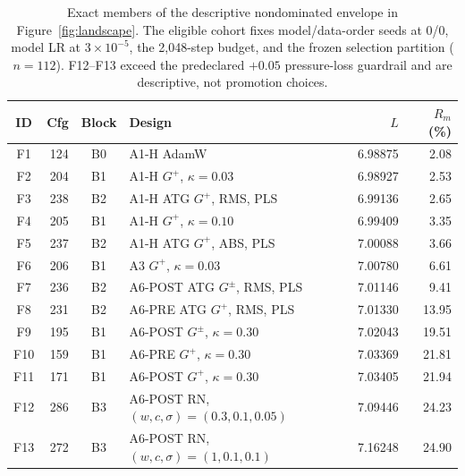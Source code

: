 \begin{table}[H]
\centering
\footnotesize
\setlength{\tabcolsep}{4.5pt}
\caption{Exact members of the descriptive nondominated envelope in Figure~\ref{fig:landscape}. The eligible cohort fixes model/data-order seeds at 0/0, model LR at $3\times10^{-5}$, the 2,048-step budget, and the frozen selection partition ($n=112$). F12--F13 exceed the predeclared $+0.05$ pressure-loss guardrail and are descriptive, not promotion choices.}
\label{tab:frontier}
\begin{tabularx}{\textwidth}{c r c X r r}
\toprule
ID & Cfg & Block & Design & $L$ & $R_m$ (\%) \\
\midrule
F1 & 124 & B0 & A1-H AdamW & 6.98875 & 2.08 \\
F2 & 204 & B1 & A1-H $G^+$, $\kappa=0.03$ & 6.98927 & 2.53 \\
F3 & 238 & B2 & A1-H ATG $G^+$, RMS, PLS & 6.99136 & 2.65 \\
F4 & 205 & B1 & A1-H $G^+$, $\kappa=0.10$ & 6.99409 & 3.35 \\
F5 & 237 & B2 & A1-H ATG $G^+$, ABS, PLS & 7.00088 & 3.66 \\
F6 & 206 & B1 & A3 $G^+$, $\kappa=0.03$ & 7.00780 & 6.61 \\
F7 & 236 & B2 & A6-POST ATG $G^\pm$, RMS, PLS & 7.01146 & 9.41 \\
F8 & 231 & B2 & A6-PRE ATG $G^+$, RMS, PLS & 7.01330 & 13.95 \\
F9 & 195 & B1 & A6-POST $G^\pm$, $\kappa=0.30$ & 7.02043 & 19.51 \\
F10 & 159 & B1 & A6-PRE $G^+$, $\kappa=0.30$ & 7.03369 & 21.81 \\
F11 & 171 & B1 & A6-POST $G^+$, $\kappa=0.30$ & 7.03405 & 21.94 \\
F12 & 286 & B3 & A6-POST RN, $(w,c,\sigma)=(0.3,0.1,0.05)$ & 7.09446 & 24.23 \\
F13 & 272 & B3 & A6-POST RN, $(w,c,\sigma)=(1,0.1,0.1)$ & 7.16248 & 24.90 \\
\bottomrule
\end{tabularx}
\end{table}
